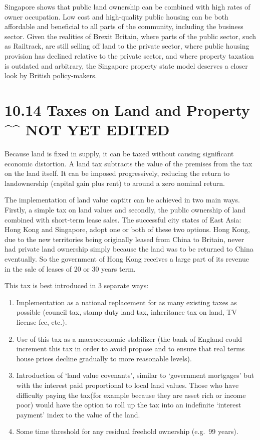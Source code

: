 \documentclass[]{tufte-handout}
\providecommand{\tightlist}{%
  \setlength{\itemsep}{0pt}\setlength{\parskip}{0pt}}
\begin{document}
Singapore shows that public land ownership can be combined with high
rates of owner occupation. Low cost and high-quality public housing can
be both affordable and beneficial to all parts of the community,
including the business sector. Given the realities of Brexit Britain,
where parts of the public sector, such as Railtrack, are still selling
off land to the private sector, where public housing provision has
declined relative to the private sector, and where property taxation is
outdated and arbitrary, the Singapore property state model deserves a
closer look by British policy-makers.

\hypertarget{taxes-on-land-and-property-not-yet-edited}{%
\section{10.14 Taxes on Land and Property \^{}\^{} NOT YET
EDITED}\label{taxes-on-land-and-property-not-yet-edited}}

Because land is fixed in supply, it can be taxed without causing
significant economic distortion. A land tax subtracts the value of the
premises from the tax on the land itself. It can be imposed
progressively, reducing the return to landownership (capital gain plus
rent) to around a zero nominal return.

The implementation of land value captitr can be achieved in two main
ways. Firstly, a simple tax on land values and secondly, the public
ownership of land combined with short-term lease sales. The successful
city states of East Asia: Hong Kong and Singapore, adopt one or both of
these two options. Hong Kong, due to the new territories being
originally leased from China to Britain, never had private land
ownership simply because the land was to be returned to China
eventually. So the government of Hong Kong receives a large part of its
revenue in the sale of leases of 20 or 30 years term.

This tax is best introduced in 3 separate ways:

\begin{enumerate}
\def\labelenumi{\arabic{enumi}.}
\tightlist
\item
  Implementation as a national replacement for as many existing taxes as
  possible (council tax, stamp duty land tax, inheritance tax on land,
  TV license fee, etc.).
\item
  Use of this tax as a macroeconomic stabilizer (the bank of England
  could increment this tax in order to avoid propose and to ensure that
  real terms house prices decline gradually to more reasonable levels).
\item
  Introduction of `land value covenants', similar to `government
  mortgages' but with the interest paid proportional to local land
  values. Those who have difficulty paying the tax(for example because
  they are asset rich or income poor) would have the option to roll up
  the tax into an indefinite `interest payment' index to the value of
  the land.
\item
  Some time threshold for any residual freehold ownership (e.g.~99
  years).
\end{enumerate}
\end{document}
